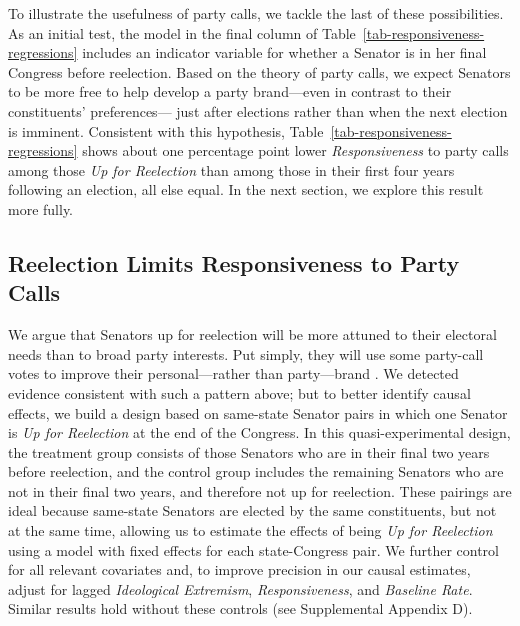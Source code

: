 \documentclass[12pt]{article}
\begin{document}
To illustrate the usefulness of party calls, we tackle the last of these possibilities. As an initial test, the model in the final column of Table~\ref{tab-responsiveness-regressions} includes an indicator variable for whether a Senator is in her final Congress before reelection.
Based on the theory of party calls,
we expect Senators to be more free to help develop a party brand---even
in contrast to their constituents' preferences---
just after elections rather than when the next election is imminent.
Consistent with this hypothesis, Table~\ref{tab-responsiveness-regressions} shows about one percentage point lower \textit{Responsiveness} to party calls among those \textit{Up for Reelection} than among those in their first four years following an election, all else equal.  In the next section, we explore this result more fully.

\subsection*{Reelection Limits Responsiveness to Party Calls}

We argue that Senators up for reelection will be more attuned to their electoral needs than to broad party interests. Put simply, they will use some party-call votes to improve their personal---rather than party---brand
\citep[e.g.,][]{Canes-Wrone:2002, Carson:2010}.  We detected evidence consistent with such a pattern above; but to better identify causal effects, we build a design based on same-state Senator pairs in which one Senator is \textit{Up for Reelection} at the end of the Congress.  In this quasi-experimental design, the treatment group consists of those Senators who are in their final two years before reelection, and the control group includes the remaining Senators who are not in their final two years, and therefore not up for reelection.  These pairings are ideal because same-state Senators are elected by the same constituents, but not at the same time, allowing us to estimate the effects of being \textit{Up for Reelection} using a model with fixed effects for each state-Congress pair.  We further control for all relevant covariates and, to improve precision in our causal estimates, adjust for lagged \textit{Ideological Extremism}, \textit{Responsiveness}, and \textit{Baseline Rate}. Similar results hold without these controls (see Supplemental Appendix D).
\end{document}

